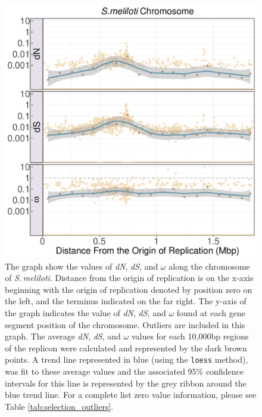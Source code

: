 \documentclass[11pt]{article}
\newcommand{\smel}{\textit{S.\,meliloti}\xspace}
\newcommand{\dn}{\textit{dN}\xspace}
\newcommand{\ds}{\textit{dS}\xspace}
\begin{document}
\begin{figure}[H]
	\begin{center}
		\includegraphics[width=\textwidth]{./figs/sinoC_dN_dS_omega_dist_NO_OUTLIERS.pdf}
		\caption{\label{fig:sinoC_selection_no_outliers}The graph show the values of \dn, \ds, and $\omega$ along the chromosome of \smel. Distance from the origin of replication is on the x-axis beginning with the origin of replication denoted by position zero on the left, and the terminus indicated on the far right. The y-axis of the graph indicates the value of \dn, \ds, and $\omega$ found at each gene segment position of the chromosome. Outliers are included in this graph. The average \dn, \ds, and $\omega$ values for each 10,000bp regions of the replicon were calculated and represented by the dark brown points. A trend line represented in blue (using the \texttt{loess} method), was fit to these average values and the associated 95\% confidence intervals for this line is represented by the grey ribbon around the blue trend line. For a complete list zero value information, please see Table \ref{tab:selection_outliers}.}
	\end{center}
\end{figure}
\end{document}
